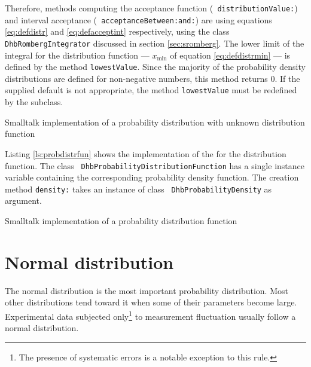 Therefore, methods computing the acceptance function ({\tt
distributionValue:}) and interval acceptance ({\tt
acceptanceBetween:and:}) are using equations \ref{eq:defdistr} and
\ref{eq:defacceptint} respectively, using the class {\tt
DhbRombergIntegrator} discussed in section \ref{sec:sromberg}. The
lower limit of the integral for the distribution function ---
$x_{\min}$ of equation \ref{eq:defdistrmin} --- is defined by the
method {\tt lowestValue}. Since the majority of the probability
density distributions are defined for non-negative numbers, this
method returns 0. If the supplied default is not appropriate, the
method {\tt lowestValue} must be redefined by the subclass.

\begin{listing} Smalltalk implementation of a probability distribution with unknown
distribution function\label{ls:probunkdistr}

\end{listing}

Listing \ref{ls:probdistrfun} shows the implementation of the
 for the distribution function. The class {\tt
DhbProbabilityDistributionFunction} has a single instance variable
containing the corresponding probability density function. The
creation method {\tt density:} takes an instance of class {\tt
DhbProbabilityDensity} as argument.

\begin{listing} Smalltalk implementation of a probability distribution function
\label{ls:probdistrfun}

\end{listing}


\section{Normal distribution}
\label{sec:normdist} The normal distribution is the most important
probability distribution. Most other distributions tend toward it
when some of their parameters become large. Experimental data
subjected only\footnote{The presence of systematic errors is a
notable exception to this rule.} to measurement fluctuation
usually follow a normal distribution.

